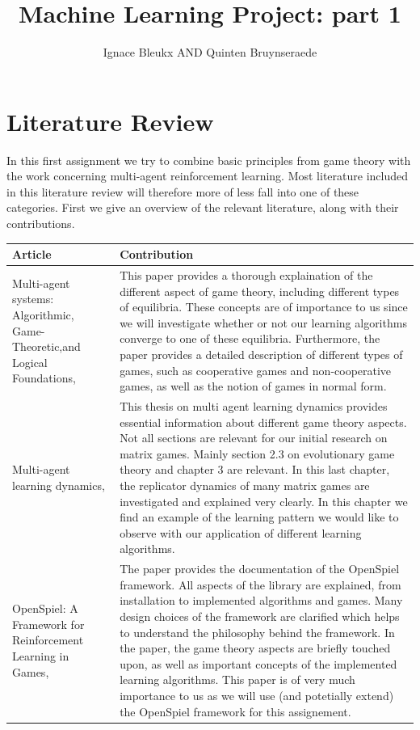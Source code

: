 \documentclass[10pt,a4paper]{article}
\author{Ignace Bleukx AND Quinten Bruynseraede}
\title{Machine Learning Project: part 1}
\begin{document}
\maketitle

\section{Literature Review}
In this first assignment we try to combine basic principles from game theory with the work concerning multi-agent reinforcement learning. Most literature included in this literature review will therefore more of less fall into one of these categories. First we give an overview of the relevant literature, along with their contributions.


\bigskip
\begin{longtable}{|p{5cm}|p{10cm}|}
\hline 
Article & Contribution \\ 
\hline 
\hline
Multi-agent systems: Algorithmic, Game-Theoretic,and Logical Foundations, \citet{mas} & This paper provides a thorough explaination of the different aspect of game theory, including different types of equilibria. These concepts are of importance to us since we will investigate whether or not our learning algorithms converge to one of these equilibria. Furthermore, the paper provides a detailed description of different types of games, such as cooperative games and non-cooperative games, as well as the notion of games in normal form.   \\ 
\hline 
Multi-agent learning dynamics, \citet{phdthesis} &  This thesis on multi agent learning dynamics provides essential information about different game theory aspects. Not all sections are relevant for our initial research on matrix games. Mainly section 2.3 on evolutionary game theory and chapter 3 are relevant. In this last chapter, the replicator dynamics of many matrix games are investigated and explained very clearly. In this chapter we find an example of the learning pattern we would like to observe with our application of different learning algorithms.   \\
\hline 
OpenSpiel: A Framework for Reinforcement Learning in Games, \citet{lanctot2019openspiel} & The paper provides the documentation of the OpenSpiel framework. All aspects of the library are explained, from installation to implemented algorithms and games. Many design choices of the framework are clarified which helps to understand the philosophy behind the framework. In the paper, the game theory aspects are briefly touched upon, as well as important concepts of the implemented learning algorithms. This paper is of very much importance to us as we will use (and potetially extend) the OpenSpiel framework for this assignement. \\ 

\end{longtable}
\end{document}
